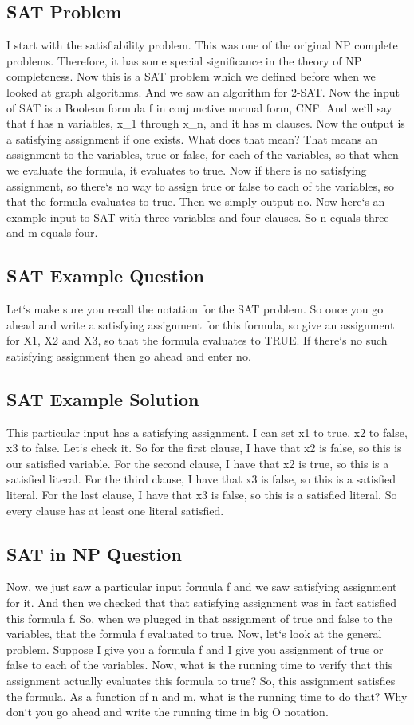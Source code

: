 \subsection{SAT Problem}
I start with the satisfiability problem.
This was one of the original NP complete problems.
Therefore, it has some special significance in the theory of NP completeness.
Now this is a SAT problem which we defined before when we looked at graph algorithms.
And we saw an algorithm for 2-SAT\@.
Now the input of SAT is a Boolean formula f in conjunctive normal form, CNF\@.
And we`ll say that f has n variables, x\_1 through x\_n, and it has m clauses.
Now the output is a satisfying assignment if one exists.
What does that mean? That means an assignment to the variables, true or false, for each of the variables, so that when we evaluate the formula, it evaluates to true.
Now if there is no satisfying assignment, so there`s no way to assign true or false to each of the variables, so that the formula evaluates to true.
Then we simply output no.
Now here`s an example input to SAT with three variables and four clauses.
So n equals three and m equals four.

\subsection{SAT Example Question}
Let`s make sure you recall the notation for the SAT problem.
So once you go ahead and write a satisfying assignment for this formula, so give an assignment for X1, X2 and X3, so that the formula evaluates to TRUE\@.
If there`s no such satisfying assignment then go ahead and enter no.

\subsection{SAT Example Solution}
This particular input has a satisfying assignment.
I can set x1 to true, x2 to false, x3 to false.
Let`s check it.
So for the first clause, I have that x2 is false, so this is our satisfied variable.
For the second clause, I have that x2 is true, so this is a satisfied literal.
For the third clause, I have that x3 is false, so this is a satisfied literal.
For the last clause, I have that x3 is false, so this is a satisfied literal.
So every clause has at least one literal satisfied.

\subsection{SAT in NP Question}
Now, we just saw a particular input formula f and we saw satisfying assignment for it.
And then we checked that that satisfying assignment was in fact satisfied this formula f.
So, when we plugged in that assignment of true and false to the variables, that the formula f evaluated to true.
Now, let`s look at the general problem.
Suppose I give you a formula f and I give you assignment of true or false to each of the variables.
Now, what is the running time to verify that this assignment actually evaluates this formula to true? So, this assignment satisfies the formula.
As a function of n and m, what is the running time to do that? Why don`t you go ahead and write the running time in big O notation.

